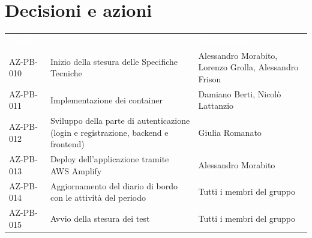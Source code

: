 \documentclass[a4paper, 11pt]{article}
\begin{document}
\section{Decisioni e azioni} \label{DecisioniAzioni}
\begin{center}
    \begin{tabular}{>{\centering\arraybackslash}m{3cm} >{\raggedright\arraybackslash}p{6cm} >{\centering\arraybackslash}p{3.5cm}}
        \rowcolor{AccentColor}
        \textcolor{white}{\textbf{Codice }} & 
        \multicolumn{1}{c}{\textcolor{white}{\textbf{Descrizione}}} & 
        \textcolor{white}{\textbf{Assegnatario}} \\
        AZ-PB-010 & Inizio della stesura delle Specifiche Tecniche & Alessandro Morabito, Lorenzo Grolla, Alessandro Frison \\
        AZ-PB-011 & Implementazione dei container  & Damiano Berti, Nicolò Lattanzio \\
        AZ-PB-012 & Sviluppo della parte di autenticazione (login e registrazione, backend e frontend) & Giulia Romanato \\
        AZ-PB-013 & Deploy dell'applicazione tramite AWS Amplify & Alessandro Morabito \\
        AZ-PB-014 & Aggiornamento del diario di bordo con le attività del periodo & Tutti i membri del gruppo \\
        AZ-PB-015 & Avvio della stesura dei test & Tutti i membri del gruppo \\
    \end{tabular}
\end{center}
\end{document}

